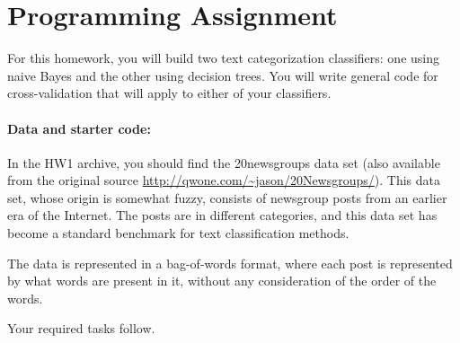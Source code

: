 \documentclass[10pt]{article}
\begin{document}
\section*{Programming Assignment}

For this homework, you will build two text categorization classifiers: one using naive Bayes and the other using decision trees. You will write general code for cross-validation that will apply to either of your classifiers. 

\paragraph{Data and starter code:} In the HW1 archive, you should find the 20newsgroups data set (also available from the original source \url{http://qwone.com/~jason/20Newsgroups/}). This data set, whose origin is somewhat fuzzy, consists of newsgroup posts from an earlier era of the Internet. The posts are in different categories, and this data set has become a standard benchmark for text classification methods. 

The data is represented in a bag-of-words format, where each post is represented by what words are present in it, without any consideration of the order of the words. 

Your required tasks follow.
\end{document}
